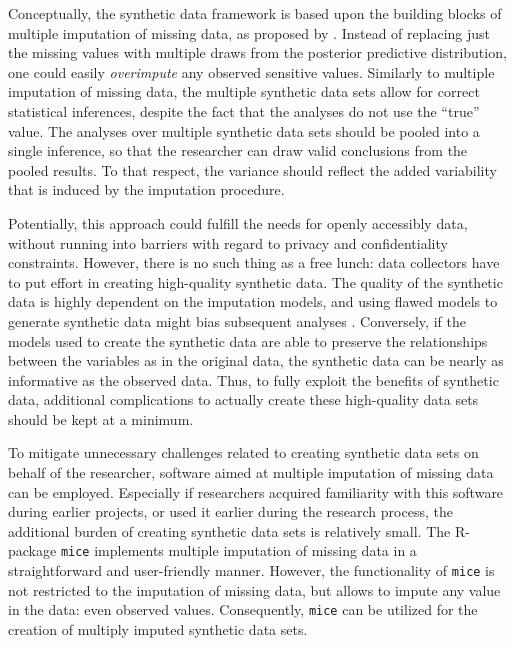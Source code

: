 \documentclass[psych,article,submit,moreauthors,pdftex]{mdpi}
\begin{document}
Conceptually, the synthetic data framework is based upon the building
blocks of multiple imputation of missing data, as proposed by
\citet{rubin_multiple_1987}. Instead of replacing just the missing
values with multiple draws from the posterior predictive distribution,
one could easily \emph{overimpute} any observed sensitive values.
Similarly to multiple imputation of missing data, the multiple synthetic
data sets allow for correct statistical inferences, despite the fact
that the analyses do not use the ``true'' value. The analyses over
multiple synthetic data sets should be pooled into a single inference,
so that the researcher can draw valid conclusions from the pooled
results. To that respect, the variance should reflect the added
variability that is induced by the imputation procedure.

Potentially, this approach could fulfill the needs for openly accessibly
data, without running into barriers with regard to privacy and
confidentiality constraints. However, there is no such thing as a free
lunch: data collectors have to put effort in creating high-quality
synthetic data. The quality of the synthetic data is highly dependent on
the imputation models, and using flawed models to generate synthetic
data might bias subsequent analyses
\citep{reiter2004simultaneous, grund2021using, jiang2021balancing}.
Conversely, if the models used to create the synthetic data are able to
preserve the relationships between the variables as in the original
data, the synthetic data can be nearly as informative as the observed
data. Thus, to fully exploit the benefits of synthetic data, additional
complications to actually create these high-quality data sets should be
kept at a minimum.

To mitigate unnecessary challenges related to creating synthetic data
sets on behalf of the researcher, software aimed at multiple imputation
of missing data can be employed. Especially if researchers acquired
familiarity with this software during earlier projects, or used it
earlier during the research process, the additional burden of creating
synthetic data sets is relatively small. The R-package \texttt{mice}
\citep{mice} implements multiple imputation of missing data in a
straightforward and user-friendly manner. However, the functionality of
\texttt{mice} is not restricted to the imputation of missing data, but
allows to impute any value in the data: even observed values.
Consequently, \texttt{mice} can be utilized for the creation of multiply
imputed synthetic data sets.
\end{document}
